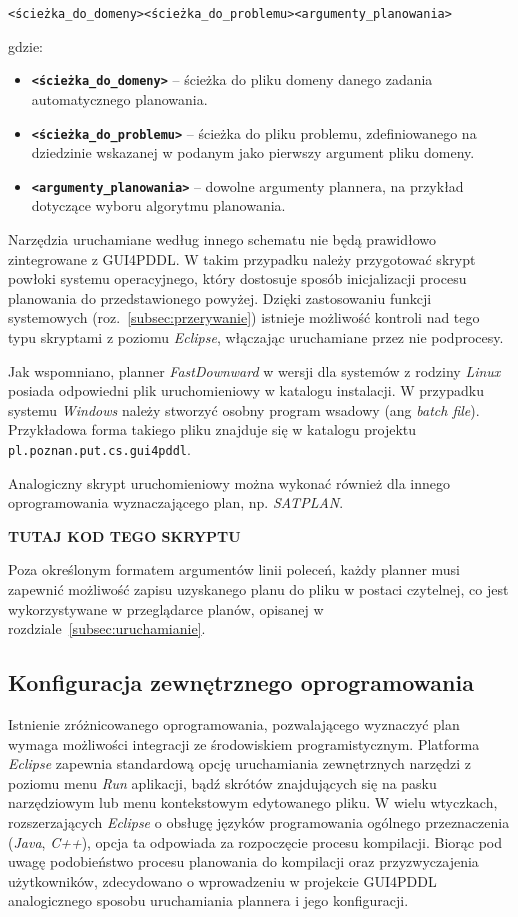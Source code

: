 \noindent
\centerline{\texttt{<ścieżka\_do\_domeny>}\textvisiblespace\texttt{<ścieżka\_do\_problemu>}\textvisiblespace\texttt{<argumenty\_planowania>}}


\noindent
gdzie:
\begin{itemize}
\item \textbf{\texttt{<ścieżka\_do\_domeny>}} -- ścieżka do pliku domeny danego zadania automatycznego planowania.
\item \textbf{\texttt{<ścieżka\_do\_problemu>}} -- ścieżka do pliku problemu, zdefiniowanego na dziedzinie wskazanej w podanym jako pierwszy argument pliku domeny.
\item \textbf{\texttt{<argumenty\_planowania>}} -- dowolne argumenty plannera, na przykład dotyczące wyboru algorytmu planowania.
\end{itemize}
Narzędzia uruchamiane według innego schematu nie będą prawidłowo zintegrowane z GUI4PDDL. W takim przypadku należy przygotować skrypt powłoki systemu operacyjnego, który dostosuje sposób inicjalizacji procesu planowania do przedstawionego powyżej. Dzięki zastosowaniu funkcji systemowych (roz.~\ref{subsec:przerywanie}) istnieje możliwość kontroli nad tego typu skryptami z poziomu \textit{Eclipse}, włączając uruchamiane przez nie podprocesy.

Jak wspomniano, planner \textit{FastDownward} w wersji dla systemów z rodziny \textit{Linux} posiada odpowiedni plik uruchomieniowy w katalogu  instalacji. W przypadku systemu \textit{Windows} należy stworzyć osobny program wsadowy (ang \textit{batch file}). Przykładowa forma takiego pliku znajduje się w katalogu  projektu \texttt{pl.poznan.put.cs.gui4pddl}.

Analogiczny skrypt uruchomieniowy można wykonać również dla innego oprogramowania wyznaczającego plan, np. \textit{SATPLAN}.

\textbf{TUTAJ KOD TEGO SKRYPTU}

Poza określonym formatem argumentów linii poleceń, każdy planner musi zapewnić możliwość zapisu uzyskanego planu do pliku w postaci czytelnej, co jest wykorzystywane w przeglądarce planów, opisanej w rozdziale~\ref{subsec:uruchamianie}.

\subsection{Konfiguracja zewnętrznego oprogramowania}
\label{subsec:konfiguracja}
Istnienie zróżnicowanego oprogramowania, pozwalającego wyznaczyć plan wymaga możliwości integracji ze środowiskiem programistycznym. Platforma \textit{Eclipse} zapewnia standardową opcję uruchamiania zewnętrznych narzędzi z poziomu menu \textit{Run} aplikacji, bądź skrótów znajdujących się na pasku narzędziowym lub menu kontekstowym edytowanego pliku. W wielu wtyczkach, rozszerzających \textit{Eclipse} o obsługę języków programowania ogólnego przeznaczenia (\textit{Java}, \textit{C++}), opcja ta odpowiada za rozpoczęcie procesu kompilacji. Biorąc pod uwagę podobieństwo procesu planowania do kompilacji oraz przyzwyczajenia użytkowników, zdecydowano o wprowadzeniu w projekcie GUI4PDDL analogicznego sposobu uruchamiania plannera i jego konfiguracji.

